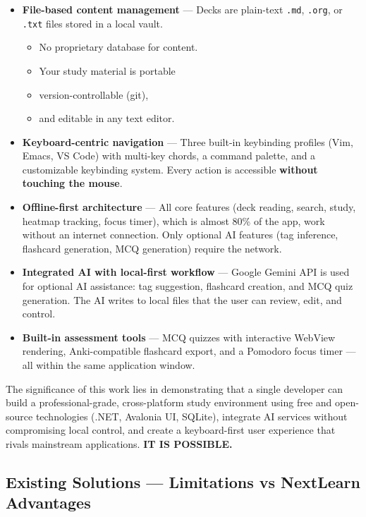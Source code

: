 \documentclass[14pt]{article}
\begin{document}
\begin{itemize}
\item \textbf{\textbf{File-based content management}} — Decks are plain-text \texttt{.md}, \texttt{.org},
or \texttt{.txt} files stored in a local vault.
\begin{itemize}
\item No proprietary database for content.
\item Your study material is portable
\item version-controllable (git),
\item and editable in any text editor.
\end{itemize}

\item \textbf{\textbf{Keyboard-centric navigation}} — Three built-in keybinding profiles
(Vim, Emacs, VS Code) with multi-key chords, a command palette, and
a customizable keybinding system. Every action is accessible
\textbf{\textbf{without touching the mouse}}.

\item \textbf{\textbf{Offline-first architecture}} — All core features (deck reading,
search, study, heatmap tracking, focus timer), which is almost 80\%
of the app, work without an internet connection. Only optional AI
 features (tag inference, flashcard generation, MCQ generation)
 require the network.

\item \textbf{\textbf{Integrated AI with local-first workflow}} — Google Gemini API is
used for optional AI assistance: tag suggestion, flashcard creation,
and MCQ quiz generation. The AI writes to local files that the user
can review, edit, and control.

\item \textbf{\textbf{Built-in assessment tools}} — MCQ quizzes with interactive WebView
rendering, Anki-compatible flashcard export, and a Pomodoro focus
timer — all within the same application window.
\end{itemize}


The significance of this work lies in demonstrating that a single
developer can build a professional-grade, cross-platform study
environment using free and open-source technologies (.NET, Avalonia UI,
SQLite), integrate AI services without compromising local control, and
create a keyboard-first user experience that rivals mainstream
applications. \textbf{\textbf{IT IS POSSIBLE.}}

\newpage
\subsection{Existing Solutions — Limitations vs NextLearn Advantages}
\label{sec:orgbf2bc32}
\end{document}
